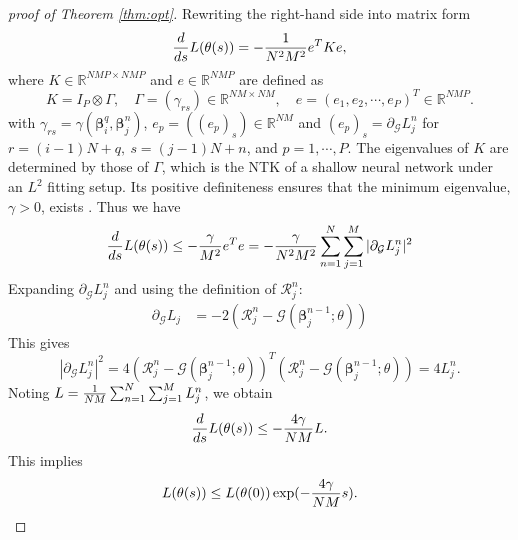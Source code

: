 \documentclass[preprint,12pt]{elsarticle}
\theoremstyle{plain}
\numberwithin{figure}{section}
\numberwithin{table}{section}
\begin{document}
\begin{proof}[proof of Theorem \ref{thm:opt}]
	Rewriting the right-hand side into matrix form
	\begin{equation}
		{d\over ds}L(\theta(s)) = -{1\over N^2M^2}e^TKe,
	\end{equation}
	where $K\in\mathbb{R}^{NMP\times NMP}$ and $e\in\mathbb{R}^{NMP}$ are defined as
	\begin{equation}
		K = I_P\otimes\Gamma , \quad \Gamma=(\gamma_{rs})\in\mathbb{R}^{NM\times NM}, \quad e = (e_1,e_2,\cdots,e_P)^T\in\mathbb{R}^{NMP}.
	\end{equation}
        with $\gamma_{rs}=\gamma(\bm{\beta}_i^q,\bm{\beta}_j^n)$, $ e_p = ((e_p)_s)\in\mathbb{R}^{NM}$ and $(e_p)_s=\partial_{\mathcal{G}}L_j^n$ for $r=(i-1)N+q,\ s=(j-1)N+n$, and $p=1,\cdots,P$.
	The eigenvalues of $K$ are determined by those of $\Gamma$, which is the NTK of a shallow neural network under an $L^2$ fitting setup. Its positive definiteness ensures that the minimum eigenvalue, $\gamma > 0$, exists \cite{jacot2018neural}. Thus we have
	\begin{equation}
		{d\over ds}L(\theta(s)) \le  -{\gamma\over M^2} e^Te=-{\gamma\over N^2M^2}\sum_{n=1}^N\sum_{j=1}^M |\partial_{\mathcal{G}}{L}_j^n|^2
	\end{equation}
	Expanding $\partial_{\mathcal{G}} L_j^n$ and using the definition of $\mathcal{R}_j^n$:
	\begin{equation}\label{eq:Ljn}
		\begin{aligned}
			\partial_{\mathcal{G}}L_j 
			& = -2(\mathcal{R}^n_j-\mathcal{G}(\bm{\beta}_j^{n-1};\theta))
		\end{aligned}
	\end{equation}
	This gives
	\begin{equation}
		|\partial_{\mathcal{G}}{L}_j^n|^2 = 4(\mathcal{R}^n_j-\mathcal{G}(\bm{\beta}_j^{n-1};\theta))^T(\mathcal{R}^n_j-\mathcal{G}(\bm{\beta}_j^{n-1};\theta))=4L_j^n.
	\end{equation}
	Noting $L={1\over NM}\sum_{n=1}^N\sum_{j=1}^M L_j^n$, we obtain
	\begin{equation}
		{d\over ds}L(\theta(s)) \le -{4\gamma\over NM} L.
	\end{equation}
	This implies 
	\begin{equation}
		L(\theta(s)) \le L(\theta(0))\exp(-{4\gamma\over NM}s).
	\end{equation}



\end{proof}
\end{document}
